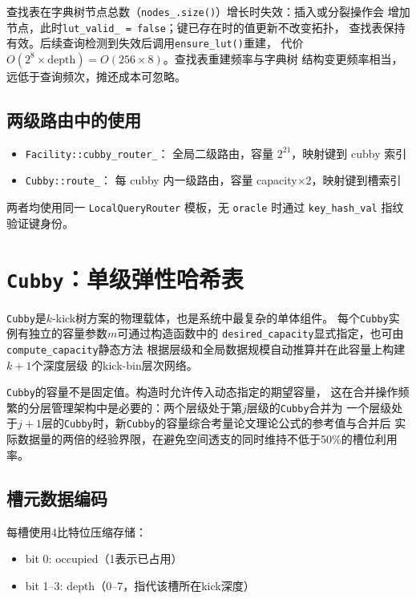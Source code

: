 \documentclass[
    type = bachelor,
    fontset = win,
    decl-page = true,
  ]{njuthesis}
\begin{document}
查找表在字典树节点总数（\texttt{nodes\_.size()}）增长时失效：插入或分裂操作会
增加节点，此时\texttt{lut\_valid\_ = false}；键已存在时的值更新不改变拓扑，
查找表保持有效。后续查询检测到失效后调用\texttt{ensure\_lut()}重建，
代价$O(2^8 \times \text{depth}) = O(256 \times 8)$。查找表重建频率与字典树
结构变更频率相当，远低于查询频次，摊还成本可忽略。

\subsection{两级路由中的使用}

\begin{itemize}
  \item \texttt{Facility::cubby\_router\_}：\newline
  全局二级路由，容量 $2^{21}$，映射键到 cubby 索引
  \item \texttt{Cubby::route\_}：\newline
  每 cubby 内一级路由，容量 capacity$\times 2$，映射键到槽索引
\end{itemize}

两者均使用同一 \texttt{LocalQueryRouter} 模板，无 \texttt{oracle} 时通过\newline
 \texttt{key\_hash\_val} 指纹验证键身份。

\section{\texttt{Cubby}：单级弹性哈希表}

\texttt{Cubby}是$k$-kick树方案的物理载体\cite{1}，也是系统中最复杂的单体组件。
每个\texttt{Cubby}实例有独立的容量参数$m$可通过构造函数中的
\texttt{desired\_capacity}显式指定，也可由\texttt{compute\_capacity}静态方法
根据层级和全局数据规模自动推算并在此容量上构建$k+1$个深度层级
的kick-bin层次网络。

\texttt{Cubby}的容量不是固定值。构造时允许传入动态指定的期望容量，
这在合并操作频繁的分层管理架构中是必要的：两个层级处于第$j$层级的\texttt{Cubby}合并为
一个层级处于$j+1$层的\texttt{Cubby}时，新\texttt{Cubby}的容量综合考量论文理论公式的参考值与合并后
实际数据量的两倍的经验界限，在避免空间透支的同时维持不低于50\%的槽位利用率。

\subsection{槽元数据编码}

每槽使用4比特位压缩存储：
\begin{itemize}
  \item bit 0: occupied（1表示已占用）
  \item bit 1--3: depth（0--7，指代该槽所在kick深度）
\end{itemize}
\end{document}
